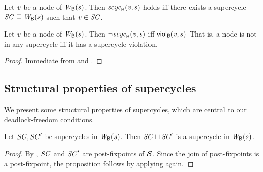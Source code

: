 \begin{definition}
\label{defn:supercycle.membership}
Let $\mathit{v}$ be a node of $\mathit{W}_{\mathsf{B}}({s})$. Then $\mathit{scyc}_{\mathsf{B}}({\mathit{v}, s})$ holds iff there exists a supercycle $\mathit{SC} \sqsubseteq \mathit{W}_{\mathsf{B}}({s})$ such that
$\mathit{v} \in \mathit{SC}$.
\end{definition}





\begin{proposition} \label{prop:scViol-iff-notInSC}
Let $\mathit{v}$ be a node of $\mathit{W}_{\mathsf{B}}({s})$. Then $\neg \mathit{scyc}_{\mathsf{B}}({\mathit{v}, s})$ iff $\mathsf{viol}_{\mathsf{B}}(\mathit{v},s)$ %
That is, a node is not in any supercycle iff it has a supercycle violation.
\end{proposition}
%
\begin{proof}
Immediate from  and .
\end{proof}








\subsection{Structural properties of supercycles}
\label{secn:supercycle-structural}


We present some structural properties of supercycles, which
are central to our deadlock-freedom conditions.


\begin{proposition} \label{prop:supercycle:union}
Let $\mathit{SC}, \mathit{SC}'$ be supercycles in $\mathit{W}_{\mathsf{B}}({s})$. Then $\mathit{SC} \sqcup \mathit{SC}'$ is
a supercycle in $\mathit{W}_{\mathsf{B}}({s})$.
\end{proposition}
%
\begin{proof}
By , $\mathit{SC}$ and $\mathit{SC}'$ are post-fixpoints of $\mathcal{S}$. Since the join of post-fixpoints is a post-fixpoint, 
the proposition follows by applying  again.
\end{proof}





